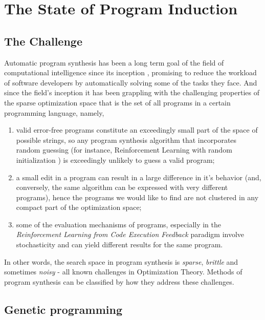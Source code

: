 \chapter{The State of Program Induction}
\label{ch:ps-methods}

\section{The Challenge}
\label{sec:ps-challenge}

Automatic program synthesis has been a long term goal of the field of computational intelligence since its inception \cite{mannaAutomaticProgramSynthesis1971}, promising to reduce the workload of software developers by automatically solving some of the tasks they face.
And since the field's inception it has been grappling with the challenging properties of the sparse optimization space \cite{alurSyntaxguidedSynthesis2013,davidProgramSynthesisChallenges2017} that is the set of all programs in a certain programming language, namely, 
\begin{enumerate}
    \item valid error-free programs constitute an exceedingly small part of the space of possible strings, so any program synthesis algorithm that incorporates random guessing (for instance, Reinforcement Learning with random initialization \cite{suttonReinforcementLearningSecond2018}) is exceedingly unlikely to guess a valid program;
    \item a small edit in a program can result in a large difference in it's behavior (and, conversely, the same algorithm can be expressed with very different programs), hence the programs we would like to find are not clustered in any compact part of the optimization space;
    \item some of the evaluation mechanisms of programs, especially in the \emph{Reinforcement Learning from Code Execution Feedback} paradigm involve stochasticity and can yield different results for the same program.
\end{enumerate}

In other words, the search space in program synthesis is \emph{sparse}, \emph{brittle} and sometimes \emph{noisy} \cite{arnoldNoisyOptimizationEvolution2002} - all known challenges in Optimization Theory.
Methods of program synthesis can be classified by how they address these challenges.

\newpage
\section{Genetic programming}
\label{sec:gp}

